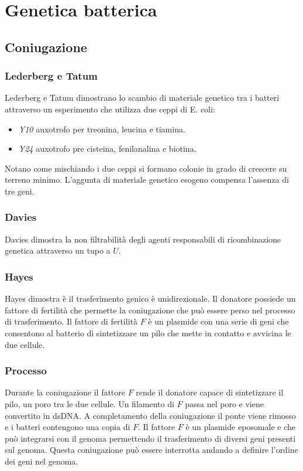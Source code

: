 \chapter{Genetica batterica}

\section{Coniugazione}

	\subsection{Lederberg e Tatum}
	Lederberg e Tatum dimostrano lo scambio di materiale genetico tra i batteri attraverso un esperimento che utilizza due ceppi di E. coli:
	\begin{multicols}{2}
		\begin{itemize}
			\item \emph{Y10} auxotrofo per treonina, leucina e tiamina.
			\item \emph{Y24} auxotrofo pre cisteina, fenilanalina e biotina.
		\end{itemize}
	\end{multicols}
	Notano come mischiando i due ceppi si formano colonie in grado di crescere su terreno minimo.
	L'aggunta di materiale genetico esogeno compensa l'assenza di tre geni.

	\subsection{Davies}
	Davies dimostra la non filtrabilit\`a degli agenti responsabili di ricombinazione genetica attraverso un tupo a $U$.
	
	\subsection{Hayes}
	Hayes dimostra \`e il trasferimento genico \`e unidirezionale.
	Il donatore possiede un fattore di fertilit\`a che permette la coniugazione che pu\`o essere perso nel processo di trasferimento.
	Il fattore di fertilit\`a $F$ \`e un plasmide con una serie di geni che consentono al batterio di sintetizzare un pilo che mette in contatto e avvicina le due cellule.

	\subsection{Processo}
	Durante la coniugazione il fattore $F$ rende il donatore capace di sintetizzare il pilo, un poro tra le due cellule.
	Un filamento di $F$ passa nel poro e viene convertito in dsDNA.
	A completamento della coniugazione il ponte viene rimosso e i batteri contengono una copia di $F$.
	Il fattore $F$ \`e un plasmide eposomale e che pu\`o integrarsi con il genoma permettendo il trasferimento di diversi geni presenti sul genoma.
	Questa coniugazione pu\`o essere interrotta andando a definire l'ordine dei geni nel genoma.

